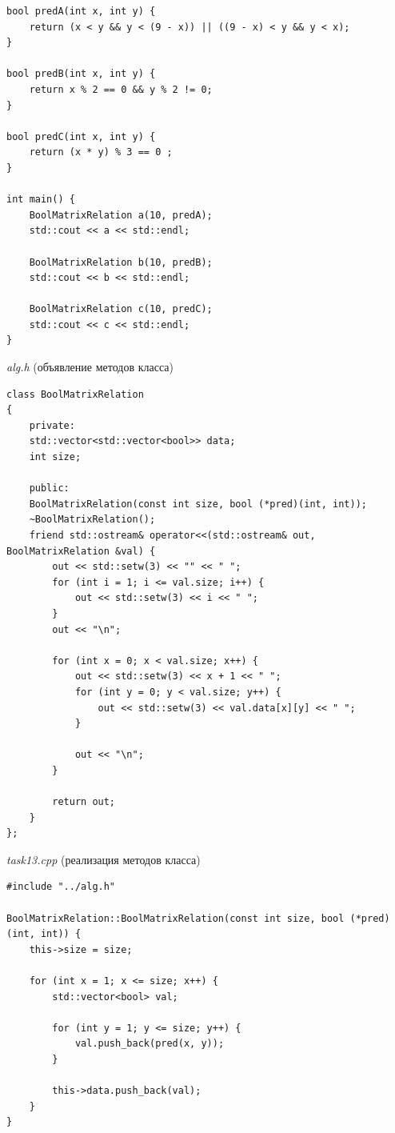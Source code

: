 \documentclass[a4paper,14pt]{extarticle}
\begin{document}
\begin{enumerate}[label=1.\arabic*.]
\begin{verbatim}
bool predA(int x, int y) {
	return (x < y && y < (9 - x)) || ((9 - x) < y && y < x);
}

bool predB(int x, int y) {
	return x % 2 == 0 && y % 2 != 0;
}

bool predC(int x, int y) {
	return (x * y) % 3 == 0 ;
}

int main() {
	BoolMatrixRelation a(10, predA);
	std::cout << a << std::endl;
	
	BoolMatrixRelation b(10, predB);
	std::cout << b << std::endl;
	
	BoolMatrixRelation c(10, predC);
	std::cout << c << std::endl;
}
    	\end{verbatim}
    \textit{alg.h} (объявление методов класса)
\begin{verbatim}
class BoolMatrixRelation
{
	private:
	std::vector<std::vector<bool>> data;
	int size;
	
	public:
	BoolMatrixRelation(const int size, bool (*pred)(int, int));
	~BoolMatrixRelation();
	friend std::ostream& operator<<(std::ostream& out, BoolMatrixRelation &val) {
		out << std::setw(3) << "" << " ";
		for (int i = 1; i <= val.size; i++) {
			out << std::setw(3) << i << " ";
		}
		out << "\n";
		
		for (int x = 0; x < val.size; x++) {
			out << std::setw(3) << x + 1 << " ";
			for (int y = 0; y < val.size; y++) {
				out << std::setw(3) << val.data[x][y] << " ";
			}
			
			out << "\n";
		}
		
		return out;
	}
};
\end{verbatim}
\textit{task13.cpp} (реализация методов класса)
\begin{verbatim}
#include "../alg.h"

BoolMatrixRelation::BoolMatrixRelation(const int size, bool (*pred)(int, int)) {
	this->size = size;
	
	for (int x = 1; x <= size; x++) {
		std::vector<bool> val;
		
		for (int y = 1; y <= size; y++) {
			val.push_back(pred(x, y));
		}
		
		this->data.push_back(val);
	}
}


\end{verbatim}
\end{enumerate}
\end{document}
